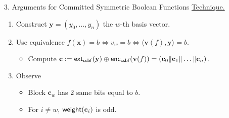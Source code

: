 \begin{frame}{3. Arguments for Committed Symmetric Boolean Functions}
	\underline{Technique.}\pause
	\begin{enumerate}
		\item Construct $\mathbf{y} = (y_0, \dots, y_n)$ the $w$-th basis vector.\pause
		\item Use equivalence $f(\mathbf{x}) = b \iff v_w = b \iff \langle\mathbf{v}(f), \mathbf{y}\rangle=b$.\pause
		\begin{itemize}
			\item Compute $\mathbf{c} := \mathsf{ext}_{\mathsf{csbf}}(\mathbf{y}) \oplus \mathsf{enc}_{\mathsf{csbf}}(\mathbf{v}(f)) = (\mathbf{c}_0 \Vert \mathbf{c}_1\Vert \dots\Vert \mathbf{c}_n)$.\pause
		\end{itemize}
		\item Observe\pause
		\begin{itemize}
			\item Block $\mathbf{c}_w$ has $2$ same bits equal to $b$.\pause
			\item For $i \neq w$, $\mathsf{weight}(\mathbf{c}_i)$ is odd.
		\end{itemize}
	\end{enumerate}
\end{frame}